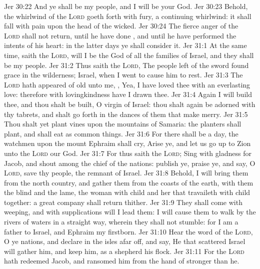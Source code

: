 \vs Jer 30:22 And ye shall be my people, and I will be your God.
\vs Jer 30:23 Behold, the whirlwind of the \textsc{Lord} goeth forth with fury, a continuing whirlwind: it shall fall with pain upon the head of the wicked.
\vs Jer 30:24 The fierce anger of the \textsc{Lord} shall not return, until he have done , and until he have performed the intents of his heart: in the latter days ye shall consider it.
\vs Jer 31:1 At the same time, saith the \textsc{Lord}, will I be the God of all the families of Israel, and they shall be my people.
\vs Jer 31:2 Thus saith the \textsc{Lord}, The people  left of the sword found grace in the wilderness;  Israel, when I went to cause him to rest.
\vs Jer 31:3 The \textsc{Lord} hath appeared of old unto me, , Yea, I have loved thee with an everlasting love: therefore with lovingkindness have I drawn thee.
\vs Jer 31:4 Again I will build thee, and thou shalt be built, O virgin of Israel: thou shalt again be adorned with thy tabrets, and shalt go forth in the dances of them that make merry.
\vs Jer 31:5 Thou shalt yet plant vines upon the mountains of Samaria: the planters shall plant, and shall eat  as common things.
\vs Jer 31:6 For there shall be a day,  the watchmen upon the mount Ephraim shall cry, Arise ye, and let us go up to Zion unto the \textsc{Lord} our God.
\vs Jer 31:7 For thus saith the \textsc{Lord}; Sing with gladness for Jacob, and shout among the chief of the nations: publish ye, praise ye, and say, O \textsc{Lord}, save thy people, the remnant of Israel.
\vs Jer 31:8 Behold, I will bring them from the north country, and gather them from the coasts of the earth,  with them the blind and the lame, the woman with child and her that travaileth with child together: a great company shall return thither.
\vs Jer 31:9 They shall come with weeping, and with supplications will I lead them: I will cause them to walk by the rivers of waters in a straight way, wherein they shall not stumble: for I am a father to Israel, and Ephraim  my firstborn.
\vs Jer 31:10 Hear the word of the \textsc{Lord}, O ye nations, and declare  in the isles afar off, and say, He that scattered Israel will gather him, and keep him, as a shepherd  his flock.
\vs Jer 31:11 For the \textsc{Lord} hath redeemed Jacob, and ransomed him from the hand of  stronger than he.
